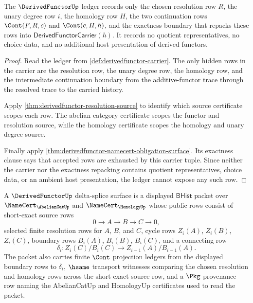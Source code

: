 \begin{theorem}\label{thm:derivedfunctor-ledger-policy-scope}
The $\DerivedFunctorUp$ ledger records only the chosen resolution row $R$, the unary degree row $i$, the homology row $H$, the two continuation rows $\Cont(F,R,c)$ and $\Cont(c,H,h)$, and the exactness boundary that repacks these rows into $\mathsf{DerivedFunctorCarrier}(h)$. It records no quotient representatives, no choice data, and no additional host presentation of derived functors.
\end{theorem}
\begin{proof}
Read the ledger from \autoref{def:derivedfunctor-carrier}. The only hidden rows in the carrier are the resolution row, the unary degree row, the homology row, and the intermediate continuation boundary from the additive-functor trace through the resolved trace to the carried history.

Apply \autoref{thm:derivedfunctor-resolution-source} to identify which source certificate scopes each row. The abelian-category certificate scopes the functor and resolution source, while the homology certificate scopes the homology and unary degree source.

Finally apply \autoref{thm:derivedfunctor-namecert-obligation-surface}. Its exactness clause says that accepted rows are exhausted by this carrier tuple. Since neither the carrier nor the exactness repacking contains quotient representatives, choice data, or an ambient host presentation, the ledger cannot expose any such row.
\end{proof}

\begin{definition}\label{def:derivedfunctor-delta-splice-surface}
A $\DerivedFunctorUp$ delta-splice surface is a displayed $\mathsf{BHist}$ packet over $\NameCert_{\AbelianCatUp}$ and $\NameCert_{\HomologyUp}$ whose public rows consist of short-exact source rows
$$
0\to A\to B\to C\to 0,
$$
selected finite resolution rows for $A$, $B$, and $C$, cycle rows $Z_i(A)$, $Z_i(B)$, $Z_i(C)$, boundary rows $B_i(A)$, $B_i(B)$, $B_i(C)$, and a connecting row
$$
\delta_i: Z_i(C)/B_i(C)\to Z_{i-1}(A)/B_{i-1}(A).
$$
The packet also carries finite $\Cont$ projection ledgers from the displayed boundary rows to $\delta_i$, $\hsame$ transport witnesses comparing the chosen resolution and homology rows across the short-exact source row, and a $\Pkg$ provenance row naming the AbelianCatUp and HomologyUp certificates used to read the packet.
\end{definition}

